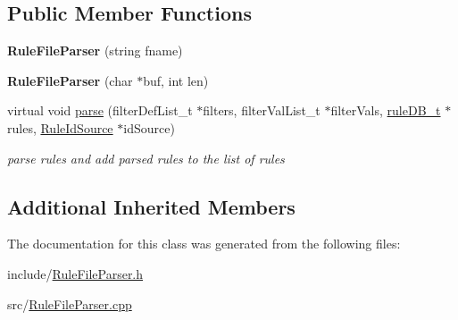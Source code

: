 \subsection*{Public Member Functions}
\begin{DoxyCompactItemize}
\item 
\mbox{\label{classRuleFileParser_a6386e0976c97bbf050bd46613754bf0f}} 
{\bfseries Rule\+File\+Parser} (string fname)
\item 
\mbox{\label{classRuleFileParser_a937b90925b91fd4a36683e8bfd9188ac}} 
{\bfseries Rule\+File\+Parser} (char $\ast$buf, int len)
\item 
\mbox{\label{classRuleFileParser_a698a0f3db42a256169191e3d6c52d559}} 
virtual void \hyperlink{classRuleFileParser_a698a0f3db42a256169191e3d6c52d559}{parse} (filter\+Def\+List\+\_\+t $\ast$filters, filter\+Val\+List\+\_\+t $\ast$filter\+Vals, \hyperlink{RuleFileParser_8h_a7d5bb94bb17a8a1d92db2a89a0cc96d1}{rule\+D\+B\+\_\+t} $\ast$rules, \hyperlink{classRuleIdSource}{Rule\+Id\+Source} $\ast$id\+Source)
\begin{DoxyCompactList}\small\item\em parse rules and add parsed rules to the list of rules \end{DoxyCompactList}\end{DoxyCompactItemize}
\subsection*{Additional Inherited Members}


The documentation for this class was generated from the following files\+:\begin{DoxyCompactItemize}
\item 
include/\hyperlink{RuleFileParser_8h}{Rule\+File\+Parser.\+h}\item 
src/\hyperlink{RuleFileParser_8cpp}{Rule\+File\+Parser.\+cpp}\end{DoxyCompactItemize}

